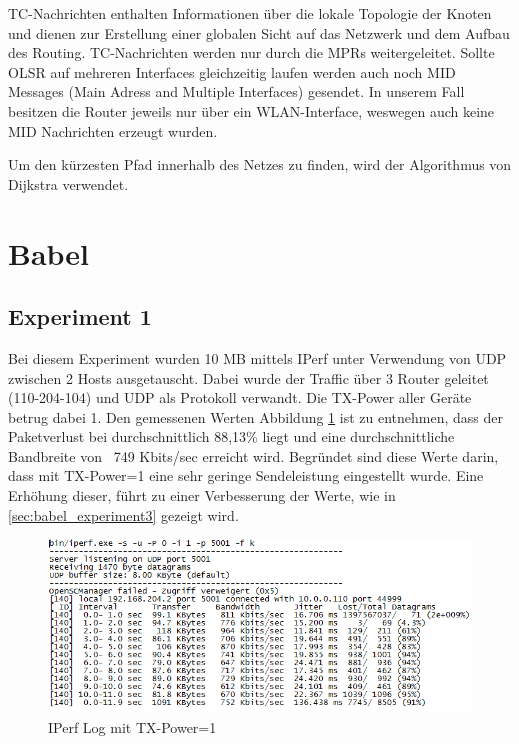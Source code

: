 \documentclass[10pt]{scrartcl}
\begin{document}
TC-Nachrichten enthalten Informationen über die lokale Topologie der Knoten und dienen zur Erstellung einer globalen Sicht auf das Netzwerk und dem Aufbau des Routing. TC-Nachrichten werden nur durch die MPRs weitergeleitet.
Sollte OLSR auf mehreren Interfaces gleichzeitig laufen werden auch noch MID Messages (Main Adress and Multiple Interfaces) gesendet. In unserem Fall besitzen die Router jeweils nur über ein WLAN-Interface, weswegen auch keine MID Nachrichten erzeugt wurden.

Um den kürzesten Pfad innerhalb des Netzes zu finden, wird der Algorithmus von Dijkstra verwendet.
    
    
    
\section{Babel}
	\subsection{Experiment 1}\label{sec:babel_experiment1}
	Bei diesem Experiment wurden 10 MB mittels IPerf  unter Verwendung von UDP zwischen 2 Hosts ausgetauscht. Dabei wurde der Traffic über 3 Router geleitet (110-204-104) und UDP als Protokoll verwandt. Die TX-Power aller Geräte betrug dabei 1. 
Den gemessenen Werten Abbildung \ref{img:babel_iperf_tx1} ist zu entnehmen, dass der Paketverlust bei durchschnittlich 88,13\% liegt und eine durchschnittliche Bandbreite von ~749 Kbits/sec erreicht wird.
Begründet sind diese Werte darin, dass mit TX-Power=1 eine sehr geringe Sendeleistung eingestellt wurde. Eine Erhöhung dieser, führt zu einer Verbesserung der Werte, wie in \ref{sec:babel_experiment3} gezeigt wird.

	\begin{figure}
        \centering
                \includegraphics[width=\textwidth]{img/Babel_TX1_Protokoll}
        \caption{IPerf Log mit TX-Power=1}
        \label{img:babel_iperf_tx1}
	\end{figure}
	
\end{document}
